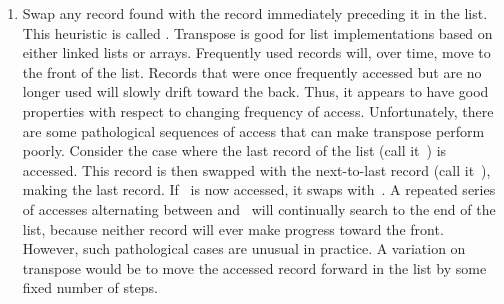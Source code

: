 \begin{enumerate}
\item
Swap any record found with the record immediately
preceding it in the list.
This heuristic is called .
Transpose is good for list implementations based on either linked
lists or arrays.
Frequently used records will, over time, move to the front of the
list.
Records that were once frequently accessed but are no longer used will
slowly drift toward the back.
Thus, it appears to have good properties with respect to changing
frequency of access.
Unfortunately, there are some pathological sequences of access that
can make transpose perform poorly.
Consider the case where the last record of the list (call it~)
is accessed.
This record is then swapped with the next-to-last record
(call it~),
making  the last record.
If~ is now accessed, it swaps with~.
A repeated series of accesses alternating between 
and~ will continually search to the end of the list,
because neither record will ever make progress toward the front.
However, such pathological cases are unusual in practice.
A variation on transpose would be to move the accessed record forward
in the list by some fixed number of steps.
\end{enumerate}

\vspace{-\bigskipamount}

